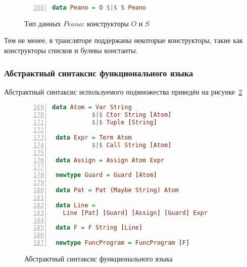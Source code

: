 \begin{figure}[h!]
  \begin{center}
  \begin{minipage}{0.5\textwidth}
  \begin{lstlisting}[language=Haskell, frame=single, numbers=left,numberstyle=\small, firstnumber=168, escapechar=|]
 data Peano = O $|$ S Peano
    \end{lstlisting}
  \end{minipage}
  \end{center}
  \caption{Тип данных $Peano$: конструкторы $O$ и $S$}
  \label{lst:peano}
\end{figure}

Тем не менее, в трансляторе поддержаны некоторые конструкторы, такие как конструкторы списков и булевы константы.


\subsubsection{Абстрактный синтаксис функционального языка}

Абстрактный синтаксис используемого подмножества \haskell{} приведён на рисунке~\ref{lst:funcast}

\begin{figure}[h!]
  \begin{center}
  \begin{minipage}{0.9\textwidth}
  \begin{lstlisting}[language=Haskell, frame=single, numbers=left,numberstyle=\small, firstnumber=169, escapechar=|]
 data Atom = Var String
           $|$ Ctor String [Atom]
           $|$ Tuple [String]

 data Expr = Term Atom
           $|$ Call String [Atom]

 data Assign = Assign Atom Expr

 newtype Guard = Guard [Atom]

 data Pat = Pat (Maybe String) Atom

 data Line =
   Line [Pat] [Guard] [Assign] [Guard] Expr

 data F = F String [Line]

 newtype FuncProgram = FuncProgram [F]
    \end{lstlisting}
  \end{minipage}
  \end{center}
  \caption{Абстрактный синтаксис функционального языка}
  \label{lst:funcast}
\end{figure}

